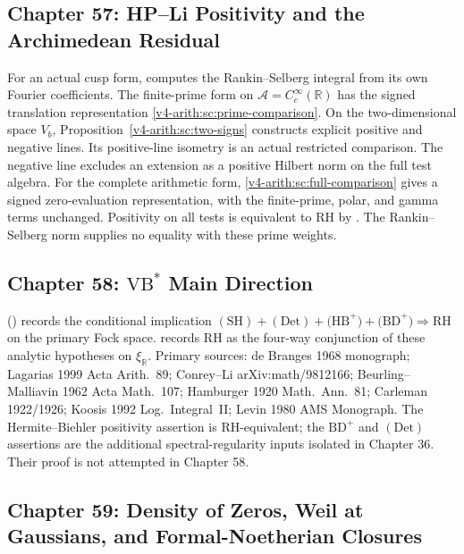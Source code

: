 \subsection{Chapter 57: HP--Li Positivity and the Archimedean Residual}
\label{v4-arith:w5-synth:ch57}

For an actual cusp form, 
computes the Rankin--Selberg integral from its own Fourier coefficients.
The finite-prime form on $\mathscr A=C_c^\infty(\mathbb R)$ has the
signed translation representation \eqref{v4-arith:sc:prime-comparison}.
On the two-dimensional space $V_b$, Proposition~\ref{v4-arith:sc:two-signs}
constructs explicit positive and negative lines. Its positive-line
isometry is an actual restricted comparison. The negative line excludes
an extension as a positive Hilbert norm on the full test algebra.
For the complete arithmetic form, \eqref{v4-arith:sc:full-comparison}
gives a signed zero-evaluation representation, with the finite-prime,
polar, and gamma terms unchanged. Positivity on all tests is equivalent
to RH by .
The Rankin--Selberg norm supplies no equality with these prime weights.

\subsection{Chapter 58: \(\mathrm{VB}^{*}\) Main Direction}
\label{v4-arith:w5-synth:ch58}

 (\ClaimStatusProvedHereConditional)
records the conditional implication
\(\mathrm{(SH)}+\mathrm{(Det)}+\mathrm{(HB}^{+})+\mathrm{(BD}^{+})
\Rightarrow \mathrm{RH}\) on the primary Fock space.
 records RH as the four-way
conjunction of these analytic hypotheses on \(\xi_{\mathbb{R}}\).
Primary sources: de Branges 1968 monograph; Lagarias 1999 Acta Arith.~89;
Conrey--Li arXiv:math/9812166; Beurling--Malliavin 1962
Acta Math.~107; Hamburger 1920 Math.~Ann.~81; Carleman 1922/1926;
Koosis 1992 Log.~Integral~II; Levin 1980 AMS Monograph.
The Hermite--Biehler positivity assertion is RH-equivalent; the
\(\mathrm{BD}^{+}\) and \(\mathrm{(Det)}\) assertions are the
additional spectral-regularity inputs isolated in Chapter 36. Their
proof is not attempted in Chapter 58.

\subsection{Chapter 59: Density of Zeros, Weil at Gaussians, and Formal-Noetherian Closures}
\label{v4-arith:w5-synth:ch59}


